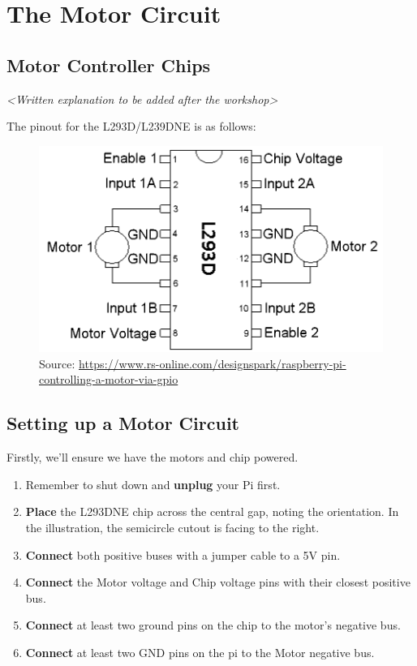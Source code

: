 \section{The Motor Circuit}
	
	\subsection{Motor Controller Chips}
		
		\textit{<Written explanation to be added after the workshop>}
		
		The pinout for the L293D/L239DNE is as follows:
		
		\begin{figure}[h]
			\centering
			\includegraphics[width=0.7\linewidth]{img/pinout_L293DNE}
			\scriptsize
			\\ Source: \url{https://www.rs-online.com/designspark/raspberry-pi-controlling-a-motor-via-gpio}
			\normalsize
			\label{fig:pinout_L293DNE}
		\end{figure}

			
	\subsection{Setting up a Motor Circuit}
		
		Firstly, we'll ensure we have the motors and chip powered.
		
		\begin{enumerate}[noitemsep]
			\item Remember to shut down and \textbf{unplug} your Pi first.
			\item \textbf{Place} the L293DNE chip across the central gap, noting the orientation. In the illustration, the semicircle cutout is facing to the right.
			\item \textbf{Connect} both positive buses with a jumper cable to a 5V pin. 
			\item \textbf{Connect} the Motor voltage and Chip voltage pins with their closest positive bus.
			\item \textbf{Connect} at least two ground pins on the chip to the motor's negative bus.
			\item \textbf{Connect} at least two GND pins on the pi to the Motor negative bus.
		\end{enumerate}
		

